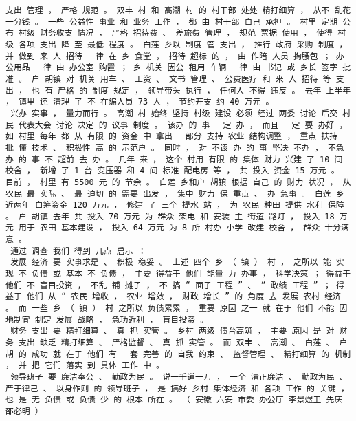 \documentclass{article}
\begin{document}
\begin{Verbatim}[commandchars=\\\{\}]
 支出 管理 ， 严格 规范 。 双丰 村 和 高潮 村 的 村干部 处处 精打细算 ， 从不 乱花 一分钱 。 一些 公益性 事业 和 业务 工作 ， 都 由 村干部 自己 承担 。 村里 定期 公布 村级 财务收支 情况 ， 严格 招待费 、 差旅费 管理 ， 规范 票据 使用 ， 使得 村级 各项 支出 降 至 最低 程度 。 白莲 乡以 制度 管 支出 ， 推行 政府 采购 制度 ， 并 做到 来 人 招待 一律 在 乡 食堂 ， 招待 超标 的 ， 由 作陪 人员 掏腰包 ； 办公用品 一律 由 办公室 购置 ； 乡 机关 因公 租用 车辆 一律 由 书记 或 乡长 签字 批准 。 户 胡镇 对 机关 用车 、 工资 、 文书 管理 、 公费医疗 和 来 人 招待 等 支出 ， 也 有 严格 的 制度 规定 ， 领导带头 执行 ， 任何人 不得 违反 。 去年 上半年 ， 镇里 还 清理 了 不 在编人员 73 人 ， 节约开支 约 40 万元 。 
 兴办 实事 ， 量力而行 。 高潮 村 始终 坚持 村级 建设 必须 经过 两委 讨论 后交 村民 代表大会 讨论 决定 的 议事 制度 。 该办 的 事 一定 办 ， 而且 一定 要 办好 ， 如 村里 每年 都 从 有限 的 资金 中 拿出 一部分 支持 农业 结构调整 ， 重点 扶持 一批 懂 技术 、 积极性 高 的 示范户 。 同时 ， 对 不该 办 的 事 坚决 不办 ， 不急 办 的 事 不 超前 去 办 。 几年 来 ， 这个 村用 有限 的 集体 财力 兴建 了 10 间 校舍 ， 新增 了 1 台 变压器 和 4 间 标准 配电房 等 ， 共 投入 资金 15 万元 。 目前 ， 村里 有 5500 元 的 节余 。 白莲 乡和户 胡镇 根据 自己 的 财力 状况 ， 从 农民 最 实际 、 最 迫切 的 需要 出发 ， 集中 财力 保 重点 、 办 急事 。 白莲 乡 近两年 自筹资金 120 万元 ， 修建 了 三个 提水 站 ， 为 农民 种田 提供 水利 保障 。 户 胡镇 去年 共 投入 70 万元 为 群众 架电 和 安装 主 街道 路灯 ， 投入 18 万元 用于 农田 基本建设 ， 投入 64 万元 为 8 所 村办 小学 改建 校舍 ， 群众 十分满意 。 
 通过 调查 我们 得到 几点 启示 ： 
 发展 经济 要 实事求是 、 积极 稳妥 。 上述 四个 乡 （ 镇 ） 村 ， 之所以 能 实现 不 负债 或 基本 不 负债 ， 主要 得益于 他们 能量 力 办事 ， 科学决策 ； 得益于 他们 不 盲目投资 ， 不乱 铺 摊子 ， 不 搞 “ 面子 工程 ” 、 “ 政绩 工程 ” ； 得益于 他们 从 “ 农民 增收 ， 农业 增效 ， 财政 增长 ” 的 角度 去 发展 农村 经济 。 而 一些 乡 （ 镇 ） 村 之所以 负债累累 ， 重要 原因 之一 就 在于 他们 不能 因地制宜 制定 发展 战略 ， 急功近利 ， 盲目投资 。 
 财务 支出 要 精打细算 、 真 抓 实管 。 乡村 两级 债台高筑 ， 主要 原因 是 对 财务 支出 缺乏 精打细算 、 严格监督 、 真 抓 实管 。 而 双丰 、 高潮 、 白莲 、 户 胡 的 成功 就 在于 他们 有 一套 完善 的 自我 约束 、 监督管理 、 精打细算 的 机制 ， 并 把 它们 落实 到 具体 工作 中 。 
 领导班子 要 廉洁奉公 、 勤政为民 。 说一千道一万 ， 一个 清正廉洁 、 勤政为民 、 严于律己 、 以身作则 的 领导班子 ， 是 搞好 乡村 集体经济 和 各项 工作 的 关键 ， 也 是 无 负债 或 负债 少 的 根本 所在 。 （ 安徽 六安 市委 办公厅 李景煜卫 先庆 邵必明 ） 

\end{Verbatim}
\end{document}
